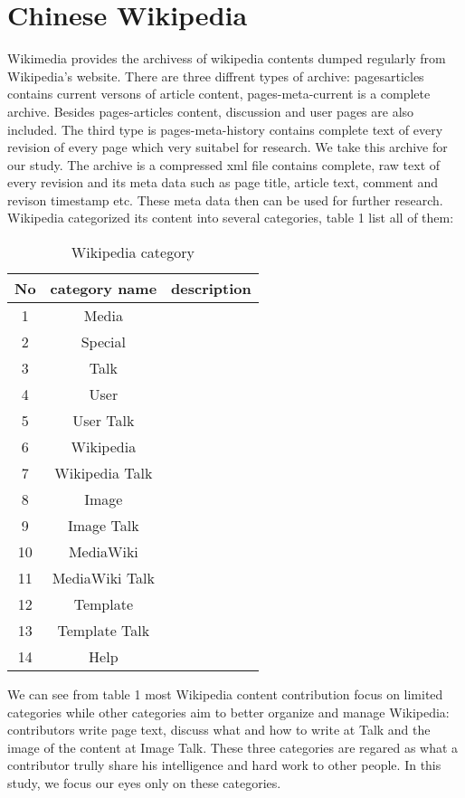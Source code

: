 \documentclass{elsarticle}
\begin{document}
\section{Chinese Wikipedia}
\label{sec:introduction-1}
Wikimedia provides the archivess of  wikipedia contents dumped
regularly from
Wikipedia's website.  There are three diffrent types of archive: 
pages\nobreakdash{-}articles contains current versons of article content,
pages-meta-current is  a   complete archive. Besides pages-articles
content, discussion and user pages are also included.  The third type
is pages-meta-history contains complete text of every revision of
every page which very suitabel  for research. We take this archive for
our study. The archive is a
compressed xml file  contains complete, raw text of every revision and
its meta data such as page title, article text, comment and revison
timestamp etc. These meta data then can be used for further research.
Wikipedia categorized its content into several categories, table 1
list all of them:
\begin{table}
  \centering
  \caption{Wikipedia category}
  \begin{tabular}[center]{|c|c|c|}
    \hline
    No  & category name  & description \\
    \hline
    1 & Media & \\\hline 
    2 &Special & \\\hline
    3 & Talk & \\\hline
    4 &  User  & \\\hline
    5 & User Talk & \\\hline
    6 & Wikipedia  & \\\hline
    7 & Wikipedia Talk & \\\hline
    8 &  Image & \\\hline
    9 & Image Talk & \\\hline
    10 &  MediaWiki& \\\hline
    11 & MediaWiki Talk& \\\hline
    12 & Template& \\\hline
    13 & Template Talk& \\\hline
    14 & Help& \\\hline
  \end{tabular}
\end{table}
We can see from table 1 most Wikipedia content contribution focus on
limited categories while other categories aim to better organize and
manage Wikipedia: contributors write page text, discuss what and how
to write at Talk and  the image of the content at Image Talk. These
three categories are regared as what a contributor trully share his
intelligence and hard work to other people. In this study, we focus
our eyes only on these categories. 
\end{document}
